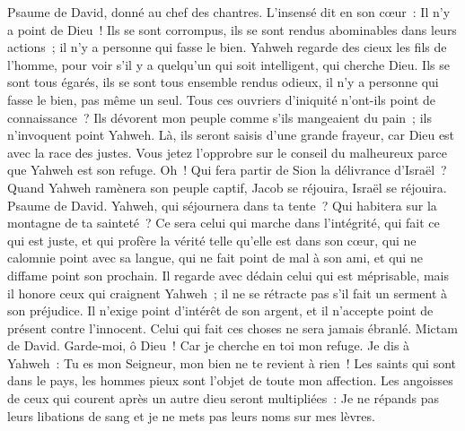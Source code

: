 \begin{multicols}{2}
\VerseOne{}Psaume de David, donné au chef des chantres. L'insensé dit en son cœur~: Il n'y a point de Dieu~! Ils se sont corrompus, ils se sont rendus abominables dans leurs actions~; il n'y a personne qui fasse le bien.
Yahweh regarde des cieux les fils de l'homme, pour voir s'il y a quelqu'un qui soit intelligent, qui cherche Dieu.
Ils se sont tous égarés, ils se sont tous ensemble rendus odieux, il n'y a personne qui fasse le bien, pas même un seul.
Tous ces ouvriers d'iniquité n'ont-ils point de connaissance~? Ils dévorent mon peuple comme s'ils mangeaient du pain~; ils n'invoquent point Yahweh.
Là, ils seront saisis d'une grande frayeur, car Dieu est avec la race des justes.
Vous jetez l'opprobre sur le conseil du malheureux parce que Yahweh est son refuge.
Oh~! Qui fera partir de Sion la délivrance d'Israël~? Quand Yahweh ramènera son peuple captif, Jacob se réjouira, Israël se réjouira.
\VerseOne{}Psaume de David. Yahweh, qui séjournera dans ta tente~? Qui habitera sur la montagne de ta sainteté~?
Ce sera celui qui marche dans l'intégrité, qui fait ce qui est juste, et qui profère la vérité telle qu'elle est dans son cœur,
qui ne calomnie point avec sa langue, qui ne fait point de mal à son ami, et qui ne diffame point son prochain.
Il regarde avec dédain celui qui est méprisable, mais il honore ceux qui craignent Yahweh~; il ne se rétracte pas s'il fait un serment à son préjudice.
Il n'exige point d'intérêt de son argent, et il n'accepte point de présent contre l'innocent. Celui qui fait ces choses ne sera jamais ébranlé.
\VerseOne{}Mictam de David. Garde-moi, ô Dieu~! Car je cherche en toi mon refuge.
Je dis à Yahweh~: Tu es mon Seigneur, mon bien ne te revient à rien~!
Les saints qui sont dans le pays, les hommes pieux sont l'objet de toute mon affection.
Les angoisses de ceux qui courent après un autre dieu seront multipliées~: Je ne répands pas leurs libations de sang et je ne mets pas leurs noms sur mes lèvres.

\end{multicols}
